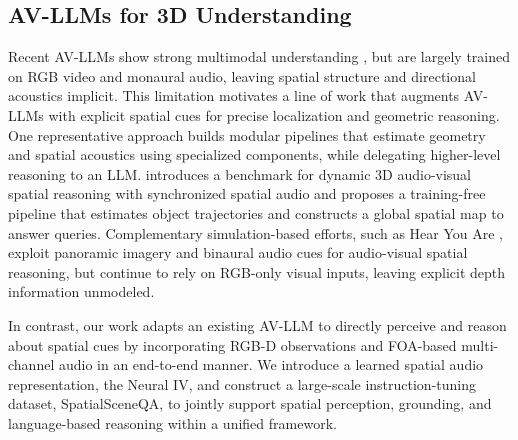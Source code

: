 \subsection{AV-LLMs for 3D Understanding}

Recent AV-LLMs show strong multimodal understanding \citep{cheng2024videollama, xu2025qwen2, Qwen3-Omni, tang2025video}, but are largely trained on RGB video and monaural audio, leaving spatial structure and directional acoustics implicit. This limitation motivates a line of work that augments AV-LLMs with explicit spatial cues for precise localization and geometric reasoning. One representative approach builds modular pipelines that estimate geometry and spatial acoustics using specialized components, while delegating higher-level reasoning to an LLM. \citep{chen2025savvy} introduces a benchmark for dynamic 3D audio-visual spatial reasoning with synchronized spatial audio and proposes a training-free pipeline that estimates object trajectories and constructs a global spatial map to answer queries. Complementary simulation-based efforts, such as Hear You Are \citep{ryu2025hear}, exploit panoramic imagery and binaural audio cues for audio-visual spatial reasoning, but continue to rely on RGB-only visual inputs, leaving explicit depth information unmodeled.

In contrast, our work adapts an existing AV-LLM to directly perceive and reason about spatial cues by incorporating RGB-D observations and FOA-based multi-channel audio in an end-to-end manner. We introduce a learned spatial audio representation, the Neural IV, and construct a large-scale instruction-tuning dataset, SpatialSceneQA, to jointly support spatial perception, grounding, and language-based reasoning within a unified framework.
